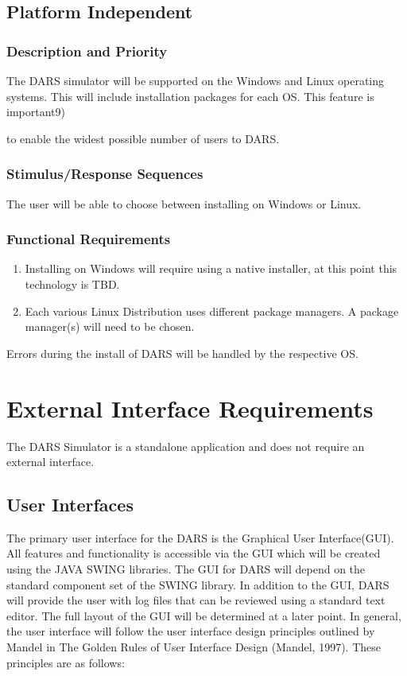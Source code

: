 \documentclass[a4paper,11pt,titlepage]{article}
\begin{document}
\subsection{Platform Independent}
\subsubsection{Description and Priority}
The DARS simulator will be supported on the Windows and Linux operating systems.
This will include installation packages for each OS. This feature is important9) {to enable the
widest possible number of users to DARS.
\subsubsection{Stimulus/Response Sequences}
The user will be able to choose between installing on Windows or Linux.

\subsubsection{Functional Requirements}

\begin{enumerate}[{\bf {REQ} 1}]
  \item  Installing on Windows will require using a native installer, at this point this
technology is TBD.
  \item Each various Linux Distribution uses different package managers. A package
manager(s) will need to be chosen.
\end{enumerate}

\begin{description}[\breaklabel]
  \item[Errors] Errors during the install of DARS will be handled by the respective OS.
\end{description}


\section{External Interface Requirements}
The DARS Simulator is a standalone application and does not require an external interface.
\subsection{User Interfaces}
The primary user interface for the DARS is the Graphical User Interface(GUI). All features
and functionality is accessible via the GUI which will be created using the JAVA SWING
libraries. The GUI for DARS will depend on the standard component set of the SWING
library. In addition to the GUI, DARS will provide the user with log files that can be reviewed
using a standard text editor. The full layout of the GUI will be determined at a later point.
In general, the user interface will follow the user interface design principles outlined by Mandel
in The Golden Rules of User Interface Design (Mandel, 1997). These principles are as
follows:

}
\end{document}
